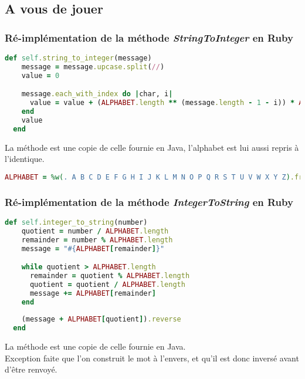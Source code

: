 \documentclass[a4paper,10pt]{article}
\begin{document}
\subsection{A vous de jouer}
\subsubsection{Ré-implémentation de la méthode \textit{StringToInteger} en Ruby}
\begin{lstlisting}[language=Ruby]
  def self.string_to_integer(message)
    message = message.upcase.split(//)
    value = 0

    message.each_with_index do |char, i|
      value = value + (ALPHABET.length ** (message.length - 1 - i)) * ALPHABET.index(char)
    end
    value
  end
\end{lstlisting}
La méthode est une copie de celle fournie en Java, l'alphabet est lui aussi repris à l'identique.\\
\begin{lstlisting}[language=Ruby]
  ALPHABET = %w(. A B C D E F G H I J K L M N O P Q R S T U V W X Y Z).freeze
\end{lstlisting}
\bigskip

\subsubsection{Ré-implémentation de la méthode \textit{IntegerToString} en Ruby}
\begin{lstlisting}[language=Ruby]
  def self.integer_to_string(number)
    quotient = number / ALPHABET.length
    remainder = number % ALPHABET.length
    message = "#{ALPHABET[remainder]}"

    while quotient > ALPHABET.length
      remainder = quotient % ALPHABET.length
      quotient = quotient / ALPHABET.length
      message += ALPHABET[remainder]
    end
    
    (message + ALPHABET[quotient]).reverse
  end
\end{lstlisting}
La méthode est une copie de celle fournie en Java.\\
Exception faite que l'on construit le mot à l'envers, et qu'il est donc inversé avant d'être renvoyé. 

\clearpage
\end{document}
